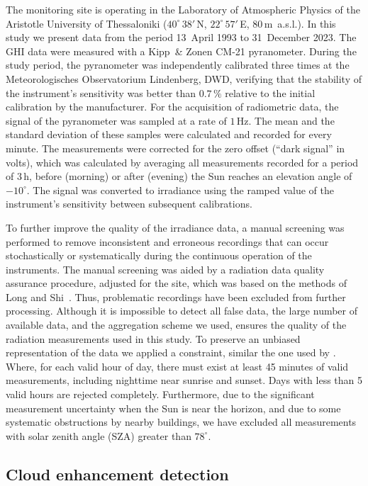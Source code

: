 \documentclass[preprint, 3p,
authoryear]{elsarticle} %
\begin{document}
The monitoring site is operating in the Laboratory of Atmospheric
Physics of the Aristotle University of Thessaloniki
(\(40^\circ\,38'\,\)N, \(22^\circ\,57'\,\)E, \(80\,\)m~a.s.l.). In this
study we present data from the period 13~April 1993 to 31~December 2023.
The GHI data were measured with a Kipp~\& Zonen CM-21 pyranometer.
During the study period, the pyranometer was independently calibrated
three times at the Meteorologisches Observatorium Lindenberg, DWD,
verifying that the stability of the instrument's sensitivity was better
than \(0.7\,\%\) relative to the initial calibration by the
manufacturer. For the acquisition of radiometric data, the signal of the
pyranometer was sampled at a rate of \(1\,\text{Hz}\). The mean and the
standard deviation of these samples were calculated and recorded for
every minute. The measurements were corrected for the zero offset
(``dark signal'' in volts), which was calculated by averaging all
measurements recorded for a period of \(3\,\text{h}\), before (morning)
or after (evening) the Sun reaches an elevation angle of \(-10^\circ\).
The signal was converted to irradiance using the ramped value of the
instrument's sensitivity between subsequent calibrations.

To further improve the quality of the irradiance data, a manual
screening was performed to remove inconsistent and erroneous recordings
that can occur stochastically or systematically during the continuous
operation of the instruments. The manual screening was aided by a
radiation data quality assurance procedure, adjusted for the site, which
was based on the methods of Long and Shi~\citep{Long2006, Long2008a}.
Thus, problematic recordings have been excluded from further processing.
Although it is impossible to detect all false data, the large number of
available data, and the aggregation scheme we used, ensures the quality
of the radiation measurements used in this study. To preserve an
unbiased representation of the data we applied a constraint, similar the
one used by \citet{CastillejoCuberos2020}. Where, for each valid hour of
day, there must exist at least 45 minutes of valid measurements,
including nighttime near sunrise and sunset. Days with less than 5 valid
hours are rejected completely. Furthermore, due to the significant
measurement uncertainty when the Sun is near the horizon, and due to
some systematic obstructions by nearby buildings, we have excluded all
measurements with solar zenith angle (SZA) greater than \(78^\circ\).

\hypertarget{cloud-enhancement-detection}{%
\subsection{Cloud enhancement
detection}\label{cloud-enhancement-detection}}
\end{document}
